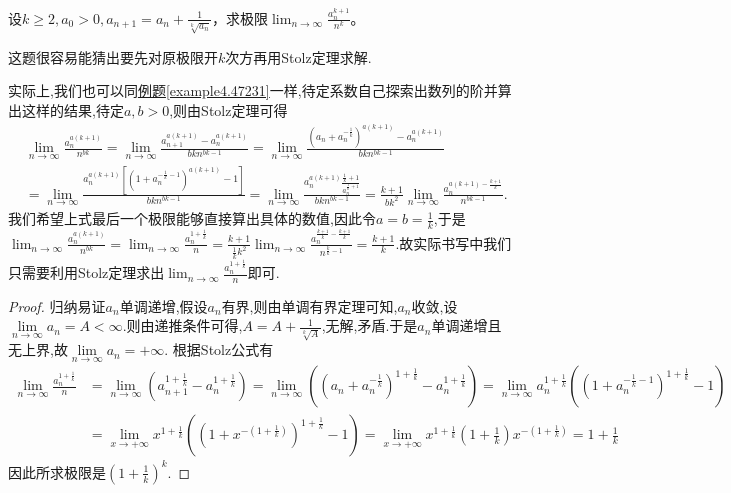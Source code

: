 \documentclass[../../main.tex]{subfiles}%
\begin{document}
\begin{example}
设\(k\geqslant 2,a_0 > 0,a_{n + 1}=a_n+\frac{1}{\sqrt[k]{a_n}}\)，求极限\(\lim_{n\rightarrow\infty}\frac{a_n^{k + 1}}{n^k}\)。
\end{example}
\begin{note}
这题很容易能猜出要先对原极限开$k$次方再用Stolz定理求解.

实际上,我们也可以同\hyperref[example4.47231]{例题\ref{example4.47231}}一样,待定系数自己探索出数列的阶并算出这样的结果,待定$a,b>0$,则由Stolz定理可得
\begin{align*}
&\lim_{n\rightarrow \infty} \frac{a_{n}^{a\left( k+1 \right)}}{n^{bk}}=\lim_{n\rightarrow \infty} \frac{a_{n+1}^{a\left( k+1 \right)}-a_{n}^{a\left( k+1 \right)}}{bkn^{bk-1}}=\lim_{n\rightarrow \infty} \frac{\left( a_n+a_{n}^{-\frac{1}{k}} \right) ^{a\left( k+1 \right)}-a_{n}^{a\left( k+1 \right)}}{bkn^{bk-1}}
\\
&=\lim_{n\rightarrow \infty} \frac{a_{n}^{a\left( k+1 \right)}\left[ \left( 1+a_{n}^{-\frac{1}{k}-1} \right) ^{a\left( k+1 \right)}-1 \right]}{bkn^{bk-1}}=\lim_{n\rightarrow \infty} \frac{a_{n}^{a\left( k+1 \right)}\frac{\frac{1}{k}+1}{a_{n}^{\frac{1}{k}+1}}}{bkn^{bk-1}}=\frac{k+1}{bk^2}\lim_{n\rightarrow \infty} \frac{a_{n}^{a\left( k+1 \right) -\frac{k+1}{k}}}{n^{bk-1}}.
\end{align*}
我们希望上式最后一个极限能够直接算出具体的数值,因此令$a=b=\frac{1}{k}$,于是$\lim_{n\rightarrow \infty} \frac{a_{n}^{a\left( k+1 \right)}}{n^{bk}}=\lim_{n\rightarrow \infty} \frac{a_{n}^{1+\frac{1}{k}}}{n}=\frac{k+1}{\frac{1}{k}k^2}\lim_{n\rightarrow \infty} \frac{a_{n}^{\frac{k+1}{k}-\frac{k+1}{k}}}{n^{\frac{k}{k}-1}}=\frac{k+1}{k}$.故实际书写中我们只需要利用Stolz定理求出\(\lim_{n\rightarrow\infty}\frac{a_n^{1+\frac{1}{k}}}{n}\)即可.
\end{note}
\begin{proof}
归纳易证\(a_n\)单调递增,假设$a_n$有界,则由单调有界定理可知,$a_n$收敛,设$\underset{n\rightarrow \infty}{\lim}a_n=A<\infty $.则由递推条件可得,$A=A+\frac{1}{\sqrt[k]{A}}$,无解,矛盾.于是$a_n$单调递增且无上界,故$\underset{n\rightarrow \infty}{\lim}a_n=+\infty$.
根据Stolz公式有
\begin{align*}
\lim_{n\rightarrow\infty}\frac{a_n^{1+\frac{1}{k}}}{n}&=\lim_{n\rightarrow\infty}\left(a_{n + 1}^{1+\frac{1}{k}}-a_n^{1+\frac{1}{k}}\right)=\lim_{n\rightarrow\infty}\left(\left(a_n + a_n^{-\frac{1}{k}}\right)^{1+\frac{1}{k}}-a_n^{1+\frac{1}{k}}\right)=\lim_{n\rightarrow\infty}a_n^{1+\frac{1}{k}}\left(\left(1 + a_n^{-\frac{1}{k}-1}\right)^{1+\frac{1}{k}}-1\right)\\
&=\lim_{x\rightarrow+\infty}x^{1+\frac{1}{k}}\left(\left(1 + x^{-(1+\frac{1}{k})}\right)^{1+\frac{1}{k}}-1\right)=\lim_{x\rightarrow+\infty}x^{1+\frac{1}{k}}\left(1+\frac{1}{k}\right)x^{-(1+\frac{1}{k})}=1+\frac{1}{k}
\end{align*}
因此所求极限是\(\left(1+\frac{1}{k}\right)^k\).
\end{proof}
\end{document}
